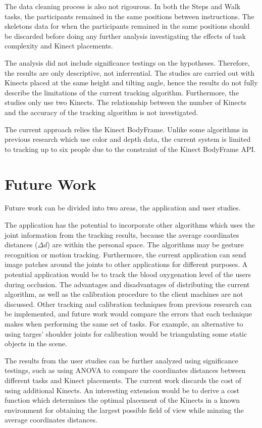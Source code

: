 The data cleaning process is also not rigourous. In both the Steps and Walk tasks, the participants remained in the same positions between instructions. The skeletons data for when the participants remained in the same positions should be discarded before doing any further analysis investigating the effects of task complexity and Kinect placements.

The analysis did not include significance testings on the hypotheses. Therefore, the results are only descriptive, not inferrential. The studies are carried out with Kinects placed at the same height and tilting angle, hence the results do not fully describe the limitations of the current tracking algorithm. Furthermore, the studies only use two Kinects. The relationship between the number of Kinects and the accuracy of the tracking algorithm is not investigated.

The current approach relies the Kinect BodyFrame. Unlike some algorithms in previous research which use color and depth data, the current system is limited to tracking up to six people due to the constraint of the Kinect BodyFrame API.

\section{Future Work}
\label{sec:discussion_future_Work}

Future work can be divided into two areas, the application and user studies.

The application has the potential to incorporate other algorithms which uses the joint information from the tracking results, because the average coordinates distances ($\Delta d$) are within the personal space. The algorithms may be gesture recognition or motion tracking. Furthermore, the current application can send image patches around the joints to other applications for different purposes. A potential application would be to track the blood oxygenation level of the users during occlusion. The advantages and disadvantages of distributing the current algorithm, as well as the calibration procedure to the client machines are not discussed. Other tracking and calibration techniques from previous research can be implemented, and future work would compare the errors that each technique makes when performing the same set of tasks. For example, an alternative to using targes' shoulder joints for calibration would be triangulating some static objects in the scene. 

The results from the user studies can be further analyzed using significance testings, such as using ANOVA to compare the coordinates distances between different tasks and Kinect placements. The current work discards the cost of using additional Kinects. An interesting extension would be to derive a cost function which determines the optimal placement of the Kinects in a known environment for obtaining the largest possible field of view while minzing the average coordinates distances.


